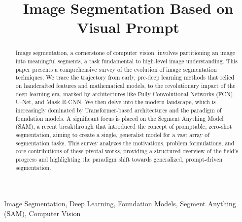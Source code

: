 \documentclass[conference]{IEEEtran}
\begin{document}
\title{Image Segmentation Based on Visual Prompt\\
}

\author{

\and
{}
}                      

\maketitle

\begin{abstract}
	Image segmentation, a cornerstone of computer vision, involves partitioning an image into meaningful segments, a task fundamental to high-level image understanding. This paper presents a comprehensive survey of the evolution of image segmentation techniques. We trace the trajectory from early, pre-deep learning methods that relied on handcrafted features and mathematical models, to the revolutionary impact of the deep learning era, marked by architectures like Fully Convolutional Networks (FCN), U-Net, and Mask R-CNN. We then delve into the modern landscape, which is increasingly dominated by Transformer-based architectures and the paradigm of foundation models. A significant focus is placed on the Segment Anything Model (SAM), a recent breakthrough that introduced the concept of promptable, zero-shot segmentation, aiming to create a single, generalist model for a vast array of segmentation tasks. This survey analyzes the motivations, problem formulations, and core contributions of these pivotal works, providing a structured overview of the field's progress and highlighting the paradigm shift towards generalized, prompt-driven segmentation.
\end{abstract}

\begin{IEEEkeywords}
	Image Segmentation, Deep Learning, Foundation Models, Segment Anything (SAM), Computer Vision
\end{IEEEkeywords}
\end{document}
